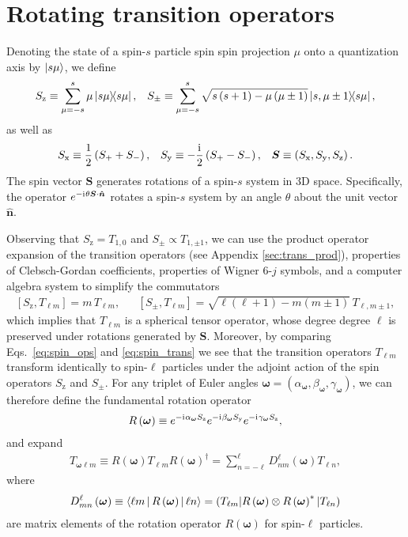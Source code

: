 \documentclass[notitlepage,twocolumn]{revtex4-2}
\newcommand{\f}[2]{\dfrac{#1}{#2}} %
\newcommand{\p}[1]{\left(#1\right)} %
\renewcommand{\sp}[1]{\left[#1\right]} %
\newcommand{\bk}{\Braket} %
\renewcommand{\v}{\bm} %
\newcommand{\uv}[1]{\bm{\hat{#1}}} %
\renewcommand{\i}{\mathrm{i}\mkern1mu} %
\newcommand{\x}{\text{x}}
\newcommand{\y}{\text{y}}
\newcommand{\z}{\text{z}}
\def\obk#1{\mathinner{({#1})}}
\begin{document}



\onecolumngrid
\appendix

\section{Rotating transition operators}
\label{sec:rotations}

Denoting the state of a spin-$s$ particle spin spin projection $\mu$ onto a quantization axis by $\ket{s\mu}$, we define
\begin{align}
  S_\z \equiv \sum_{\mu=-s}^s \mu \op{s\mu},
  &&
  S_\pm \equiv \sum_{\mu=-s}^s
  \sqrt{s\p{s+1}-\mu\p{\mu\pm1}} \op{s,\mu\pm1}{s\mu},
  \label{eq:spin_ops}
\end{align}
as well as
\begin{align}
  S_\x \equiv \f12\p{S_+ + S_-},
  &&
  S_\y \equiv -\f\i2\p{S_+-S_-},
  &&
  \v S \equiv \p{S_\x,S_\y,S_\z}.
\end{align}
The spin vector $\v S$ generates rotations of a spin-$s$ system in 3D space.
Specifically, the operator $e^{-\i\theta\v S\cdot\uv n}$ rotates a spin-$s$ system by an angle $\theta$ about the unit vector $\uv n$.

Observing that $S_\z=T_{1,0}$ and $S_\pm\propto T_{1,\pm1}$, we can use the product operator expansion of the transition operators (see Appendix \ref{sec:trans_prod}), properties of Clebsch-Gordan coefficients, properties of Wigner $6$-$j$ symbols, and a computer algebra system to simplify the commutators
\begin{align}
  \sp{S_\z,T_{\ell m}} = m\, T_{\ell m},
  &&
  \sp{S_\pm,T_{\ell m}} = \sqrt{\ell\p{\ell+1}-m\p{m\pm 1}}\, T_{\ell,m\pm1},
  \label{eq:spin_trans}
\end{align}
which implies that $T_{\ell m}$ is a spherical tensor operator, whose degree degree $\ell$ is preserved under rotations generated by $\v S$.
Moreover, by comparing Eqs.~\eqref{eq:spin_ops} and \eqref{eq:spin_trans} we see that the transition operators $T_{\ell m}$ transform identically to spin-$\ell$ particles under the adjoint action of the spin operators $S_\z$ and $S_\pm$.
For any triplet of Euler angles $\v\omega=\p{\alpha_{\v\omega},\beta_{\v\omega},\gamma_{\v\omega}}$, we can therefore define the fundamental rotation operator
\begin{align}
  R\p{\v\omega} \equiv e^{-\i\alpha_{\v\omega}S_\z} e^{-\i\beta_{\v\omega}S_\y} e^{-\i\gamma_{\v\omega}S_\z},
\end{align}
and expand
\begin{align}
  T_{\v\omega\ell m}
  \equiv R\p{\v\omega} T_{\ell m} R\p{\v\omega}^\dag
  = \sum_{n=-\ell}^\ell D_{nm}^\ell\p{\v\omega} T_{\ell n},
\end{align}
where
\begin{align}
  D_{mn}^\ell\p{\v\omega} \equiv \bk{\ell m|R\p{\v\omega}|\ell n}
  = \obk{T_{\ell m}|R\p{\v\omega}\otimes R\p{\v\omega}^*|T_{\ell n}}
\end{align}
are matrix elements of the rotation operator $R\p{\v\omega}$ for spin-$\ell$ particles.
\end{document}
